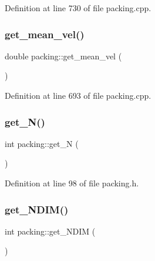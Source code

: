 Definition at line 730 of file packing.\+cpp.

\mbox{\label{classpacking_a72af770ca74d1b7cf93301210b4aee63}} 
\subsubsection{\texorpdfstring{get\+\_\+mean\+\_\+vel()}{get\_mean\_vel()}}
{\footnotesize\ttfamily double packing\+::get\+\_\+mean\+\_\+vel (\begin{DoxyParamCaption}{ }\end{DoxyParamCaption})}



Definition at line 693 of file packing.\+cpp.

\mbox{\label{classpacking_addc33dab6e59ce3a959b1987ac0a4fce}} 
\subsubsection{\texorpdfstring{get\+\_\+\+N()}{get\_N()}}
{\footnotesize\ttfamily int packing\+::get\+\_\+N (\begin{DoxyParamCaption}{ }\end{DoxyParamCaption})\hspace{0.3cm}{\ttfamily [inline]}}



Definition at line 98 of file packing.\+h.

\mbox{\label{classpacking_a09b1231993da19d68581f630365d0c3a}} 
\subsubsection{\texorpdfstring{get\+\_\+\+N\+D\+I\+M()}{get\_NDIM()}}
{\footnotesize\ttfamily int packing\+::get\+\_\+\+N\+D\+IM (\begin{DoxyParamCaption}{ }\end{DoxyParamCaption})\hspace{0.3cm}{\ttfamily [inline]}}




